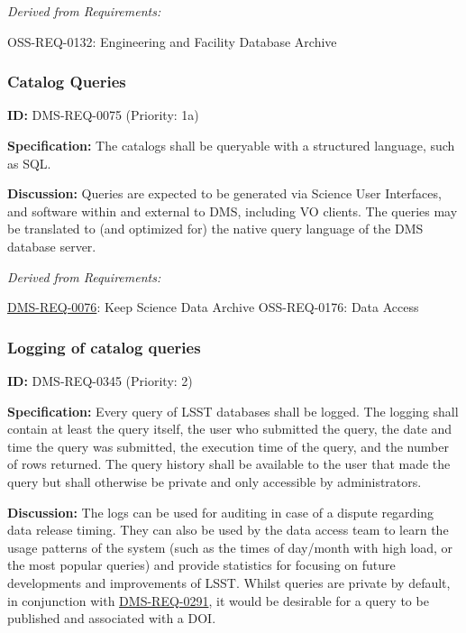\documentclass[SE,toc,lsstdraft]{lsstdoc}
\begin{document}
\emph{Derived from Requirements:}

OSS-REQ-0132:
Engineering and Facility Database Archive \newline

\subsubsection{Catalog Queries}

\label{DMS-REQ-0075}
\textbf{ID:} DMS-REQ-0075 (Priority: 1a)

\textbf{Specification:} The catalogs shall be queryable with a structured language, such as SQL.

\textbf{Discussion:} Queries are expected to be generated via Science User Interfaces, and software within and external to DMS, including VO clients. The queries may be translated to (and optimized for) the native query language of the DMS database server.

\emph{Derived from Requirements:}

\hyperref[DMS-REQ-0076]{DMS-REQ-0076}:
Keep Science Data Archive \newline
OSS-REQ-0176:
Data Access \newline

\subsubsection{Logging of catalog queries}

\label{DMS-REQ-0345}
\textbf{ID:} DMS-REQ-0345 (Priority: 2)

    \textbf{Specification: }Every query of LSST databases shall be logged. The logging shall contain at least the query itself, the user who submitted the query, the date and time the query was submitted, the execution time of the query, and the number of rows returned. The query history shall be available to the user that made the query but shall otherwise be private and only accessible by administrators.

    \textbf{Discussion: }The logs can be used for auditing in case of a dispute regarding data release timing. They can also be used by the data access team to learn the usage patterns of the system (such as the times of day/month with high load, or the most popular queries) and provide statistics for focusing on future developments and improvements of LSST. Whilst queries are private by default, in conjunction with \hyperref[DMS-REQ-0291]{DMS-REQ-0291}, it would be desirable for a query to be published and associated with a DOI.
\end{document}
